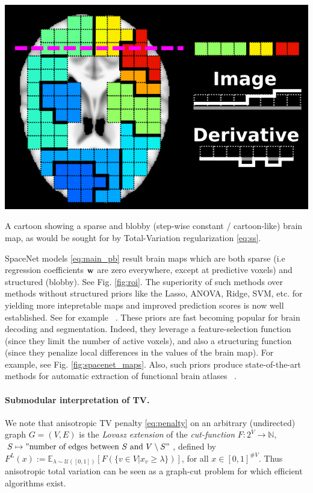 \begin{marginfigure}
  \includegraphics[width=1\linewidth]{figures/tv_cartoon_horizontal.png}
  \caption{A cartoon showing a sparse and blobby (step-wise constant / cartoon-like) brain map,
  as would be sought for by Total-Variation regularization \eqref{eq:ss}.}
  \label{fig:roi}
\end{marginfigure}

SpaceNet models \eqref{eq:main_pb} result brain maps which are both
sparse (i.e regression coefficients $\mathbf{w}$ are zero everywhere, except at
predictive voxels) and structured (blobby). See Fig. \ref{fig:roi}. The superiority of such
methods over methods without structured priors like the Lasso, ANOVA,
Ridge, SVM, etc. for yielding more intepretable maps and improved
prediction scores is now well established. See for example
 ~\citep{baldassarre2012,gramfort2013}. These priors are fast becoming
popular for brain decoding and segmentation. Indeed, they leverage a
feature-selection function
(since they limit the number of active voxels),
and also a structuring function
(since they penalize local
differences in the values of the brain map). For example, see Fig.
\ref{fig:spacenet_maps}.
Also, such priors produce state-of-the-art methods for automatic
extraction of functional brain atlases  ~\citep{abraham2013}.

\begin{shaded}
  \paragraph{Submodular interpretation of TV.} We note that anisotropic TV penalty \eqref{eq:penalty} on
  an arbitrary (undirected) graph $G = (V,E)$ is the \textit{Lovasz extension} of the \textit{cut-function}
  $F : 2^V \rightarrow \mathbb N$, $S \mapsto "\text{number of edges between } S \text{ and }V\setminus S"$,
defined by $F^L(x) := \mathbb E_{\lambda \sim \mathcal U([0,1])}[F(\{v \in V|x_v \ge \lambda\})]$, for all $x \in [0,1]^{\#V}$. Thus anisotropic total variation can be seen as a graph-cut problem for which efficient algorithms exist.
\end{shaded}

